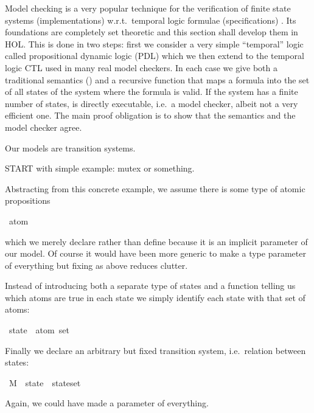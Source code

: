 %
\begin{isabellebody}%
\def\isabellecontext{Base}%
%
%
\begin{isamarkuptext}%
Model checking is a very popular technique for the verification of finite
state systems (implementations) w.r.t.\ temporal logic formulae
(specifications) \cite{Clark}. Its foundations are completely set theoretic
and this section shall develop them in HOL. This is done in two steps: first
we consider a very simple ``temporal'' logic called propositional dynamic
logic (PDL) which we then extend to the temporal logic CTL used in many real
model checkers. In each case we give both a traditional semantics (\isa{{\isasymTurnstile}}) and a
recursive function  that maps a formula into the set of all states of
the system where the formula is valid. If the system has a finite number of
states,  is directly executable, i.e.\ a model checker, albeit not a
very efficient one. The main proof obligation is to show that the semantics
and the model checker agree.

Our models are transition systems.

START with simple example: mutex or something.

Abstracting from this concrete example, we assume there is some type of
atomic propositions%
\end{isamarkuptext}%
\ atom%
\begin{isamarkuptext}%
\noindent
which we merely declare rather than define because it is an implicit parameter of our model.
Of course it would have been more generic to make  a type parameter of everything
but fixing  as above reduces clutter.

Instead of introducing both a separate type of states and a function
telling us which atoms are true in each state we simply identify each
state with that set of atoms:%
\end{isamarkuptext}%
\ state\ {\isacharequal}\ {\isachardoublequote}atom\ set{\isachardoublequote}%
\begin{isamarkuptext}%
\noindent
Finally we declare an arbitrary but fixed transition system, i.e.\ relation between states:%
\end{isamarkuptext}%
\ M\ {\isacharcolon}{\isacharcolon}\ {\isachardoublequote}{\isacharparenleft}state\ {\isasymtimes}\ state{\isacharparenright}set{\isachardoublequote}%
\begin{isamarkuptext}%
\noindent
Again, we could have made  a parameter of everything.%
\end{isamarkuptext}%
\end{isabellebody}%
